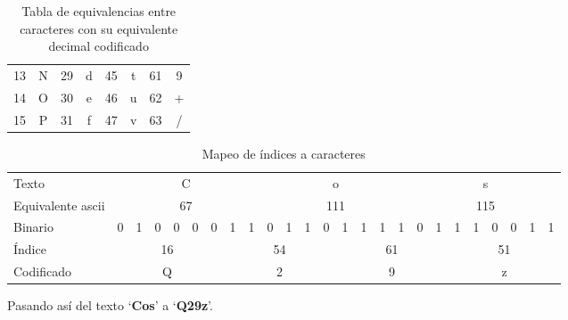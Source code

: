 \documentclass[titlepage,a4paper]{article}
\begin{document}
\begin{table}[H]
\begin{tabular}{cc|cc|cc|cc}
\rowcolor[HTML]{F8F9FA} 
{\color[HTML]{202122} 13}             & {\color[HTML]{202122} N}                 & {\color[HTML]{202122} 29}             & {\color[HTML]{202122} d}                 & {\color[HTML]{202122} 45}             & {\color[HTML]{202122} t}                 & {\color[HTML]{202122} 61}             & {\color[HTML]{202122} 9}                 \\
\rowcolor[HTML]{F8F9FA} 
{\color[HTML]{202122} 14}             & {\color[HTML]{202122} O}                 & {\color[HTML]{202122} 30}             & {\color[HTML]{202122} e}                 & {\color[HTML]{202122} 46}             & {\color[HTML]{202122} u}                 & {\color[HTML]{202122} 62}             & {\color[HTML]{202122} +}                 \\
\rowcolor[HTML]{F8F9FA} 
{\color[HTML]{202122} 15}             & {\color[HTML]{202122} P}                 & {\color[HTML]{202122} 31}             & {\color[HTML]{202122} f}                 & {\color[HTML]{202122} 47}             & {\color[HTML]{202122} v}                 & {\color[HTML]{202122} 63}             & {\color[HTML]{202122} /}                
\end{tabular}
\caption{Tabla de equivalencias entre caracteres con su equivalente decimal codificado}
\label{table:equivalencias}
\centering
\end{table}

\begin{table}[H]
\centering
\setlength{\tabcolsep}{4pt}
\begin{tabular}{l|cccccc||cc|cccc||cccc|cc||cccccc}
Texto             & \multicolumn{8}{c|}{C}        & \multicolumn{8}{c|}{o}        & \multicolumn{8}{c}{s}        \\
Equivalente ascii & \multicolumn{8}{c|}{67}       & \multicolumn{8}{c|}{111}      & \multicolumn{8}{c}{115}      \\
Binario           &0& 1 & 0 & 0 & 0 & 0 & 1 & 1 & 0 & 1 & 1 & 0 & 1 & 1 & 1 & 1 & 0 & 1 & 1 & 1 & 0 & 0 & 1 & 1 \\
Índice & \multicolumn{6}{c||}{16} & \multicolumn{6}{c||}{54} & \multicolumn{6}{c||}{61} & \multicolumn{6}{c}{51} \\
Codificado & \multicolumn{6}{c||}{Q} & \multicolumn{6}{c||}{2} & \multicolumn{6}{c||}{9} & \multicolumn{6}{c}{z}
\end{tabular}
\caption{Mapeo de índices a caracteres}
\label{table:paso_3}
\centering
\end{table}

Pasando así del texto `\textbf{Cos}' a `\textbf{Q29z}'.
\end{document}
